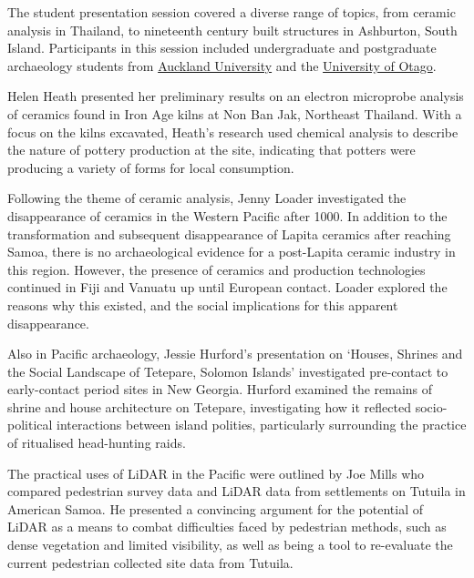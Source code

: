 
The  student presentation session covered a diverse range of topics, from ceramic analysis in Thailand, to nineteenth century built structures in Ashburton, South Island. Participants in this session included undergraduate and postgraduate archaeology students from \href{http://www.arts.auckland.ac.nz/en/about/subjects-and-courses/anthropology.html}{Auckland University} and the \href{http://www.otago.ac.nz/anthropology/research/archaeology/index.html}{University of Otago}. 

Helen Heath presented her preliminary results on an electron microprobe analysis of ceramics found in Iron Age kilns at Non Ban Jak, Northeast Thailand. With a focus on the kilns excavated, Heath’s research used chemical analysis to describe the nature of pottery production at the site, indicating that potters were producing a variety of forms for local consumption. 

Following the theme of ceramic analysis, Jenny Loader investigated the disappearance of ceramics in the Western Pacific after 1000\BC. In addition to the transformation and subsequent disappearance of Lapita ceramics after reaching Samoa, there is no archaeological evidence for a post-Lapita ceramic industry in this region. However, the presence of ceramics and production technologies continued in Fiji and Vanuatu up until European contact. Loader explored the reasons why this existed, and the social implications for this apparent disappearance. 

Also in Pacific archaeology, Jessie Hurford’s presentation on ‘Houses, Shrines and the Social Landscape of Tetepare, Solomon Islands’ investigated pre-contact to early-contact period sites in New Georgia. Hurford examined the remains of shrine and house architecture on Tetepare, investigating how it reflected socio-political interactions between island polities, particularly surrounding the practice of ritualised head-hunting raids.

The practical uses of LiDAR in the Pacific were outlined by Joe Mills who compared pedestrian survey data and LiDAR data from settlements on Tutuila in American Samoa. He presented a convincing argument for the potential of LiDAR as a means to combat difficulties faced by pedestrian methods, such as dense vegetation and limited visibility, as well as being a tool to re-evaluate the current pedestrian collected site data from Tutuila.  

